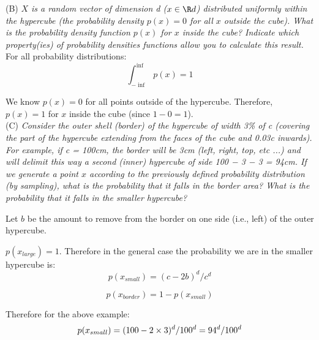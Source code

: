 \documentclass{amsart}
\theoremstyle{definition}
\theoremstyle{remark}
\numberwithin{equation}{section}
\begin{document}
(B) \textit{$X$ is a random vector of dimension d ($x \in \R d$) distributed 
uniformly within the hypercube (the probability density  $p(x) = 0$ for all $x$ 
outside the cube). What is the probability density function $p(x)$ for $x$ inside 
the cube? Indicate which property(ies) of probability densities functions allow 
you to calculate this result.}\\

For all probability distributions: \\

\begin{equation}
    \int_{-\inf}^{\inf}p(x) = 1
\end{equation}

We know $p(x) = 0$ for all points outside of the hypercube. Therefore,
$p(x) = 1$ for $x$ inside the cube (since $1-0 = 1$). \\

(C) \textit{Consider the outer shell (border) of the hypercube of width 
3\% of c (covering the part of the hypercube extending from the faces of 
the cube and 0.03c inwards). For example, if c = 100cm, the border will
be 3cm (left, right, top, etc ...) and will delimit this way a second
(inner) hypercube of side 100 − 3 − 3 = 94cm. If we generate a point $x$
according to the previously defined probability distribution (by 
sampling), what is the probability that it falls in the border area? What
is the probability that it falls in the smaller hypercube?}

Let $b$ be the amount to remove from the border on one side (i.e., left) 
of the outer hypercube.

$p(x_{large}) = 1$. Therefore in the general case the probability we are in the smaller hypercube is:\\

\begin{equation}
    p(x_{small}) = (c-2b)^d / c^d
\end{equation}

\begin{equation}
    p(x_{border}) = 1 - p(x_{small})
\end{equation}

Therefore for the above example: \\

\begin{equation}
    p(x_{small}) = (100 - 2 \times 3)^d / 100^d = 94^d / 100^d \\
\end{equation}
\end{document}

